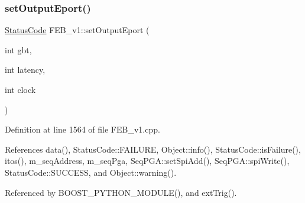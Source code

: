 \subsubsection{\texorpdfstring{set\+Output\+Eport()}{setOutputEport()}\hspace{0.1cm}{\footnotesize\ttfamily [1/2]}}
{\footnotesize\ttfamily \hyperlink{classStatusCode}{Status\+Code} F\+E\+B\+\_\+v1\+::set\+Output\+Eport (\begin{DoxyParamCaption}\item[{int}]{gbt,  }\item[{int}]{latency,  }\item[{int}]{clock }\end{DoxyParamCaption})}



Definition at line 1564 of file F\+E\+B\+\_\+v1.\+cpp.



References data(), Status\+Code\+::\+F\+A\+I\+L\+U\+RE, Object\+::info(), Status\+Code\+::is\+Failure(), itos(), m\+\_\+seq\+Address, m\+\_\+seq\+Pga, Seq\+P\+G\+A\+::set\+Spi\+Add(), Seq\+P\+G\+A\+::spi\+Write(), Status\+Code\+::\+S\+U\+C\+C\+E\+SS, and Object\+::warning().



Referenced by B\+O\+O\+S\+T\+\_\+\+P\+Y\+T\+H\+O\+N\+\_\+\+M\+O\+D\+U\+L\+E(), and ext\+Trig().


